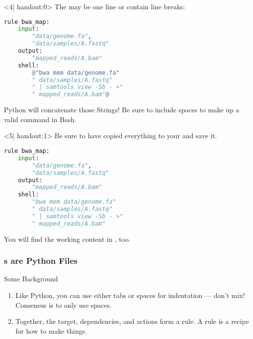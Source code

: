 \begin{frame}[fragile]
  \begin{onlyenv}<4| handout:0>
   The  may be one line or contain line breaks:
  \begin{lstlisting}[language=Python,style=Python]
rule bwa_map:
    input:
        "data/genome.fa",
        "data/samples/A.fastq"
    output:
        "mapped_reads/A.bam"
    shell:
        @"bwa mem data/genome.fa"
        " data/samples/A.fastq"
        " | samtools view -Sb - >"
        " mapped_reads/A.bam"@
    \end{lstlisting}
    \bcattention Python will concatenate those Strings! Be sure to include spaces to make up a valid command in Bash.
  \end{onlyenv}
  \begin{onlyenv}<5| handout:1>
   Be sure to have copied everything to your  and save it.
   \begin{lstlisting}[language=Python,style=Python]
rule bwa_map:
    input:
        "data/genome.fa",
        "data/samples/A.fastq"
    output:
        "mapped_reads/A.bam"
    shell:
        "bwa mem data/genome.fa"
        " data/samples/A.fastq"
        " | samtools view -Sb - >"
        " mapped_reads/A.bam"
    \end{lstlisting}
    You will find the working content in , too.
  \end{onlyenv}
\end{frame}

\begin{frame}
  \frametitle{s are Python Files}
  \begin{block}{Some Background}
     \begin{enumerate}
       \item Like Python, you can use either tabs or spaces for indentation — don’t mix! Consensus is to only use spaces.
       \item Together, the target, dependencies, and actions form a rule. A rule is a recipe for how to make things.
  \end{enumerate}
  \end{block}
\end{frame}

